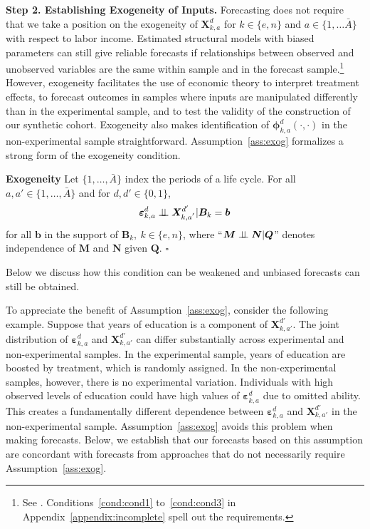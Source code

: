 \begin{figure}
\end{figure}

\textbf{Step 2. Establishing Exogeneity of Inputs.} Forecasting does not require that we take a position on the exogeneity of $\bm{X}^d_{k,a}$ for $k \in \{e,n\}$ and $a \in \{ 1, \ldots \bar{A} \}$ with respect to labor income. Estimated structural models with biased parameters can still give reliable forecasts if relationships between observed and unobserved variables are the same within sample and in the forecast sample.\footnote{See \cite{Liu-etal-2016-USC-Data-Models}.  Conditions~\ref{cond:cond1} to~\ref{cond:cond3} in Appendix~\ref{appendix:incomplete} spell out the requirements.} However, exogeneity facilitates the use of economic theory to interpret treatment effects, to forecast outcomes in samples where inputs are manipulated differently than in the experimental sample, and to test the validity of the construction of our synthetic cohort. Exogeneity also makes identification of $\bm{\phi}^d_{k,a}\left( \cdot, \cdot \right)$ in the non-experimental sample straightforward. Assumption~\ref{ass:exog} formalizes a strong form of the exogeneity condition.

\onehalfspacing
\begin{assumption}\label{ass:exog} \textbf{Exogeneity}
Let $\{ 1, \ldots, \bar{A} \}$ index the periods of a life cycle. For all $a, a' \in \{ 1, \ldots, \bar{A} \}$ and for $d, d' \in \{0,1\}$,
\begin{equation}
\bm{\varepsilon}^d_{k,a} \perp\!\!\!\perp \bm{X}^{d^{\prime}}_{k,a^{'}} | \bm{B}_k = \bm{b}
\end{equation}
for all $\bm{b}$ in the support of $\bm{B}_k, \: k \in \{e,n\}$, where ``$\bm{M} \perp\!\!\!\perp \bm{N}|\bm{Q}$'' denotes independence of $\bm{M}$ and $\bm{N}$ given $\bm{Q}$. $\square$
\end{assumption}
\doublespacing
Below we discuss how this condition can be weakened and unbiased forecasts can still be obtained.

To appreciate the benefit of Assumption~\ref{ass:exog}, consider the following example. Suppose that years of education is a component of $\bm{X}^{d'}_{k,{a'}}$. The joint distribution of $\bm{\varepsilon}_{k,a}^d$ and $\bm{X}^{d'}_{k,{a'}}$ can differ substantially across experimental and non-experimental samples. In the experimental sample, years of education are boosted by treatment, which is randomly assigned. In the non-experimental samples, however, there is no experimental variation. Individuals with high observed levels of education could have high values of $\bm{\varepsilon}_{k,a}^d$ due to omitted ability. This creates a fundamentally different dependence between $\bm{\varepsilon}_{k,a}^d$ and $\bm{X}_{k,{a'}}^{d'}$ in the non-experimental sample. Assumption~\ref{ass:exog} avoids this problem when making forecasts. Below, we establish that our forecasts based on this assumption are concordant with forecasts from approaches that do not necessarily require Assumption~\ref{ass:exog}.

